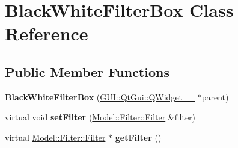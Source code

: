 \hypertarget{classGUI_1_1BlackWhiteFilterBox}{}\section{Black\+White\+Filter\+Box Class Reference}
\label{classGUI_1_1BlackWhiteFilterBox}
\subsection*{Public Member Functions}
\begin{DoxyCompactItemize}
\item 
\hypertarget{classGUI_1_1BlackWhiteFilterBox_ac637b8c4964ce7ea7b89215dfdada1bc}{}{\bfseries Black\+White\+Filter\+Box} (\hyperlink{classGUI_1_1QtGui_1_1QWidget____10}{G\+U\+I\+::\+Qt\+Gui\+::\+Q\+Widget\+\_\+\+\_} $\ast$parent)\label{classGUI_1_1BlackWhiteFilterBox_ac637b8c4964ce7ea7b89215dfdada1bc}

\item 
\hypertarget{classGUI_1_1BlackWhiteFilterBox_ad7c0ee00fe3faac7942d75eec2a5342b}{}virtual void {\bfseries set\+Filter} (\hyperlink{classModel_1_1Filter_1_1Filter}{Model\+::\+Filter\+::\+Filter} \&filter)\label{classGUI_1_1BlackWhiteFilterBox_ad7c0ee00fe3faac7942d75eec2a5342b}

\item 
\hypertarget{classGUI_1_1BlackWhiteFilterBox_acef2029a93f4ab3a538cdb643b9c2613}{}virtual \hyperlink{classModel_1_1Filter_1_1Filter}{Model\+::\+Filter\+::\+Filter} $\ast$ {\bfseries get\+Filter} ()\label{classGUI_1_1BlackWhiteFilterBox_acef2029a93f4ab3a538cdb643b9c2613}

\end{DoxyCompactItemize}
